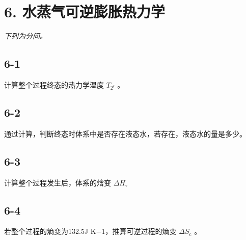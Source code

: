 \section*{6. 水蒸气可逆膨胀热力学}
\textit{下列为分问。}

\subsection*{6-1}
计算整个过程终态的热⼒学温度 $T _ { 2 ^ { \varsigma } }$ 。

\subsection*{6-2}
通过计算，判断终态时体系中是否存在液态⽔，若存在，液态⽔的量是多少。

\subsection*{6-3}
计算整个过程发⽣后，体系的焓变 $\Delta H _ { \circ }$

\subsection*{6-4}
若整个过程的熵变为132.5J K−1，推算可逆过程的熵变 $\Delta S _ { \mathrm { c } }$ 。
